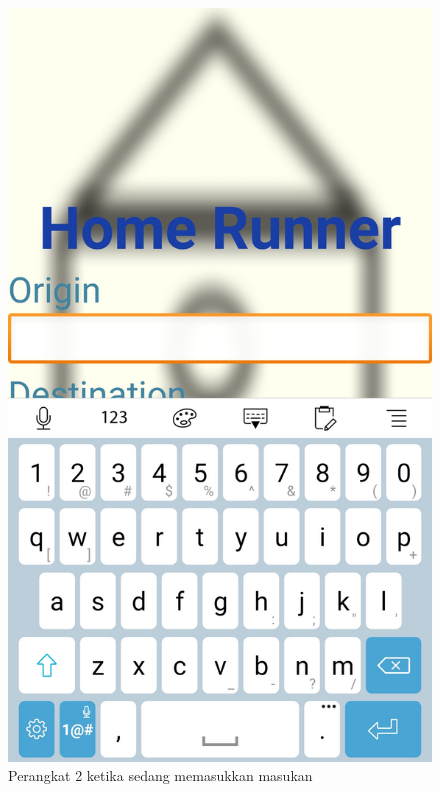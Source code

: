 \begin{figure}[!htb]
\endminipage\hfill
{}
  \includegraphics[width=\linewidth]{Gambar/asus-zenfone2-screenshot.png}
  \caption{Perangkat 2 ketika sedang memasukkan masukan}\label{fig:zenfone2-screenshot}
\endminipage\hfill
{}%

\end{figure}
